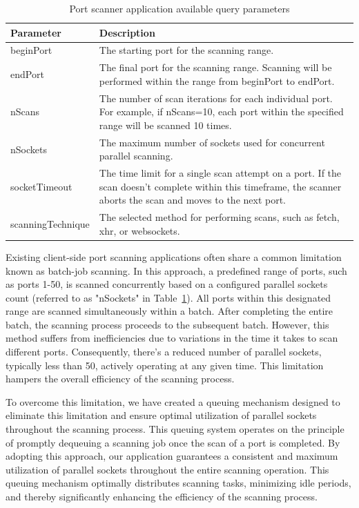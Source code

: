\begin{table}[htbp]
\footnotesize
\centering
\begin{tabular}{p{3cm} p{10cm}}
    \toprule
    Parameter & Description \\
    \midrule
    beginPort & The starting port for the scanning range. \\
    endPort & The final port for the scanning range. Scanning will be performed within the range from beginPort to endPort. \\
    nScans & The number of scan iterations for each individual port. For example, if nScans=10, each port within the specified range will be scanned 10 times. \\
    nSockets & The maximum number of sockets used for concurrent parallel scanning. \\
    socketTimeout & The time limit for a single scan attempt on a port. If the scan doesn't complete within this timeframe, the scanner aborts the scan and moves to the next port. \\
    scanningTechnique & The selected method for performing scans, such as fetch, xhr, or websockets. \\
    \bottomrule
\end{tabular}
\caption{Port scanner application available query parameters}
\label{tab:port-scan-params}
\end{table}

Existing client-side port scanning applications often share a common limitation known as batch-job scanning. In this approach, a predefined range of ports, such as ports 1-50, is scanned concurrently based on a configured parallel sockets count (referred to as "nSockets" in Table~\ref{tab:port-scan-params}). All ports within this designated range are scanned simultaneously within a batch. After completing the entire batch, the scanning process proceeds to the subsequent batch. However, this method suffers from inefficiencies due to variations in the time it takes to scan different ports. Consequently, there's a reduced number of parallel sockets, typically less than 50, actively operating at any given time. This limitation hampers the overall efficiency of the scanning process.

To overcome this limitation, we have created a queuing mechanism designed to eliminate this limitation and ensure optimal utilization of parallel sockets throughout the scanning process. This queuing system operates on the principle of promptly dequeuing a scanning job once the scan of a port is completed. By adopting this approach, our application guarantees a consistent and maximum utilization of parallel sockets throughout the entire scanning operation. This queuing mechanism optimally distributes scanning tasks, minimizing idle periods, and thereby significantly enhancing the efficiency of the scanning process.


